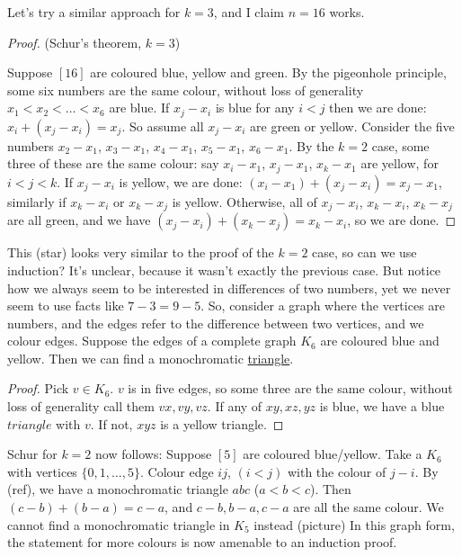 \documentclass{article}
\begin{document}
Let's try a similar approach for $k=3$, and I claim $n=16$ works.

\begin{proof}(Schur's theorem, $k=3$)

    Suppose $[16]$ are coloured blue, yellow and green.  By the pigeonhole principle, some six numbers are the same colour, without loss of generality $x_1 < x_2 < \dots < x_6$ are blue.
    If $x_j - x_i$ is blue for any $i<j$ then we are done: $x_i + (x_j - x_i) = x_j$.  So assume all $x_j - x_i$ are green or yellow.
    Consider the five numbers $x_2 - x_1$, $x_3 - x_1$, $x_4 - x_1$, $x_5 - x_1$, $x_6 - x_1$.  By the $k=2$ case, some three of these are the same colour: say $x_i - x_1$, $x_j - x_1$, $x_k - x_1$ are yellow, for $i < j < k$.
    If $x_j - x_i$ is yellow, we are done: $(x_i - x_1) + (x_j - x_i) = x_j - x_1$, similarly if $x_k - x_i$ or $x_k - x_j$ is yellow.
    Otherwise, all of $x_j - x_i$, $x_k - x_i$, $x_k - x_j$ are all green, and we have $(x_j - x_i) + (x_k - x_j) = x_k - x_i$, so we are done.
\end{proof}

This (star) looks very similar to the proof of the $k=2$ case, so can we use induction? It's unclear, because it wasn't exactly the previous case.  But notice how we always seem to be interested in differences of two numbers, yet we never seem to use facts like $7-3 = 9-5$.
So, consider a graph where the vertices are numbers, and the edges refer to the difference between two vertices, and we colour edges.
Suppose the edges of a complete graph $K_6$ are coloured blue and yellow. Then we can find a monochromatic \hyperref[def:triangle]{triangle}.
\begin{proof}
    Pick $v \in K_6$. $v$ is in five edges, so some three are the same colour, without loss of generality call them $vx, vy, vz$. If any of $xy, xz, yz$ is blue, we have a blue $triangle$ with $v$. If not, $xyz$ is a yellow triangle.
\end{proof}

\begin{remark}
    Schur for $k=2$ now follows: Suppose $[5]$ are coloured blue/yellow. Take a $K_6$ with vertices $\{0, 1, \dots, 5\}$. Colour edge $ij$, $(i<j)$ with the colour of $j-i$. By (ref), we have a monochromatic triangle $abc$ ($a<b<c$). Then $(c-b) + (b-a) = c-a$, and $c-b, b-a, c-a$ are all the same colour.
    We cannot find a monochromatic triangle in $K_5$ instead (picture)
    In this graph form, the statement for more colours is now amenable to an induction proof.
\end{remark}
\end{document}
